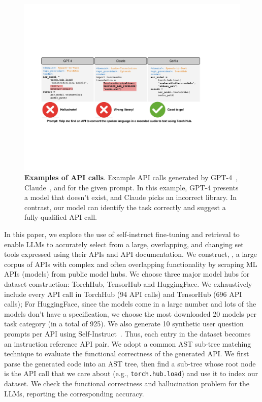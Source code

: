 \begin{figure}[t]
    \includegraphics[width=\linewidth]{figures/code-examples.pdf}
\caption{\footnotesize \textbf{Examples of API calls}. Example API calls generated by GPT-4~\cite{openai2023gpt4}, Claude~\cite{Claude}, and \oursmethod{} for the given prompt. In this example, GPT-4 presents a model that doesn't exist, and Claude picks an incorrect library. In contrast, our \oursmethod{} model can identify the task correctly and suggest a fully-qualified API call.}
\label{fig:examplecode}
\end{figure}


In this paper, we explore the use of self-instruct fine-tuning and retrieval to enable LLMs to accurately select from a large, overlapping, and changing set tools expressed using their APIs and API documentation.
We construct, \oursdataset{}, a large corpus of APIs with complex and often overlapping functionality by scraping ML APIs (models) from public model hubs.  
We choose three major model hubs for dataset construction: TorchHub, TensorHub and HuggingFace. We exhaustively include every API call in TorchHub (94 API calls) and TensorHub (696 API calls); For HuggingFace, since the models come in a large number and lots of the models don't have a specification, we choose the most downloaded 20 models per task category (in a total of 925). We also generate 10 synthetic user question prompts per API using Self-Instruct~\cite{wang2022self}. Thus, each entry in the dataset becomes an instruction reference API pair. We adopt a common AST sub-tree matching technique to evaluate the functional correctness of the generated API. We first parse the generated code into an AST tree, then find a sub-tree whose root node is the API call that we care about (e.g., \texttt{torch.hub.load}) and use it to index our dataset. We check the functional correctness and hallucination problem for the LLMs, reporting the corresponding accuracy. 

